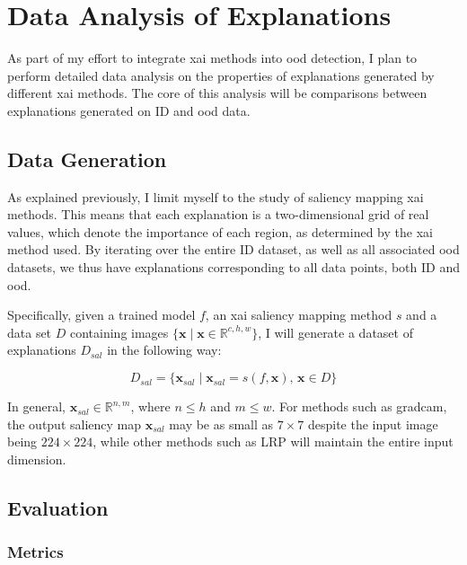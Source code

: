 \documentclass[UKenglish]{uiomasterthesis} %
\newcommand{\R}{\mathbb{R}}
\theoremstyle{definition}
\begin{document}
\section{Data Analysis of Explanations}

As part of my effort to integrate \ac{xai} methods into \ac{ood} detection, I plan to perform detailed data analysis on the properties of explanations generated by different \ac{xai} methods. The core of this analysis will be comparisons between explanations generated on ID and \ac{ood} data.

\subsection{Data Generation}

As explained previously, I limit myself to the study of saliency mapping \ac{xai} methods. This means that each explanation is a two-dimensional grid of real values, which denote the importance of each region, as determined by the \ac{xai} method used. By iterating over the entire ID dataset, as well as all associated \ac{ood} datasets, we thus have explanations corresponding to all data points, both ID and \ac{ood}.

Specifically, given a trained model $f$, an \ac{xai} saliency mapping method $s$ and a data set $D$ containing images $\{ \mathbf{x} \mid \mathbf{x} \in \R^{c, h, w} \}$, I will generate a dataset of explanations $D_{sal}$ in the following way:

{\large
\begin{equation}
    D_{sal} = \{ \mathbf{x}_{sal} \mid \mathbf{x}_{sal} = s(f, \mathbf{x}), \, \mathbf{x} \in D \}
\end{equation}
}

In general, $\mathbf{x}_{sal} \in \R^{n, m}$, where $n \leq h$ and $m \leq w$. For methods such as \ac{gradcam}, the output saliency map $\mathbf{x}_{sal}$ may be as small as $7 \times 7$ despite the input image being $224 \times 224$, while other methods such as LRP will maintain the entire input dimension.

\subsection{Evaluation}

\subsubsection{Metrics}
\end{document}
